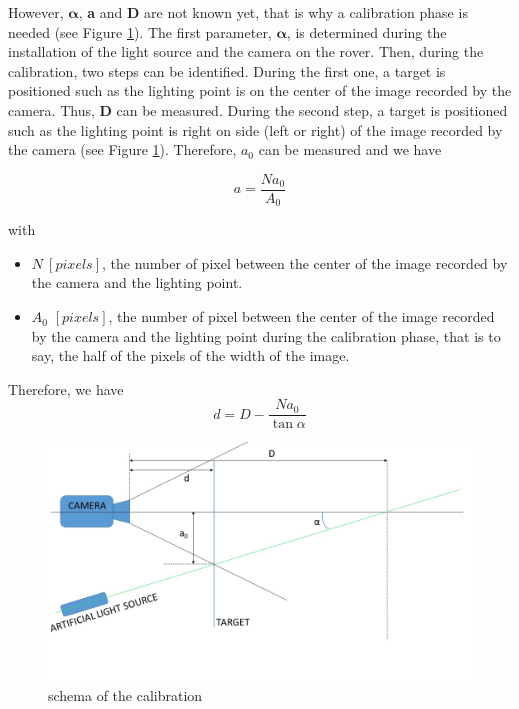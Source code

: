 However, $\bm{\alpha}$, \textbf{a} and \textbf{D} are not known yet, that is why a calibration phase is needed (see Figure \ref{fig:calibration}). The first parameter, $\bm{\alpha}$, is determined during the installation of the light source and the camera on the rover. Then, during the calibration, two steps can be identified. During the first one, a target is positioned such as the lighting point is on the center of the image recorded by the camera. Thus, \textbf{D} can be measured. During the second step, a target is positioned such as the lighting point is right on side (left or right) of the image recorded by the camera (see Figure \ref{fig:calibration}). Therefore, $a_0$ can be measured and we have

\begin{equation*}
	a = \frac{Na_0}{A_0}
\end{equation*}


with \begin{itemize} \item $N\ [pixels]$, the number of pixel between the center of the image recorded by the camera and the lighting point.
\item $A_0$ $[pixels]$, the number of pixel between the center of the image recorded by the camera and the lighting point during the calibration phase, that is to say, the half of the pixels of the width of the image.
\end{itemize}

Therefore, we have
\begin{equation}
	d=D-\frac{Na_0}{\tan \alpha}
\label{eq:formule1D}
\end{equation}

\begin{figure}[H]
  \centerline{\includegraphics[scale=0.4]{fig/calibration.jpg}}
  \caption{schema of the calibration}
  \label{fig:calibration}
\end{figure}


